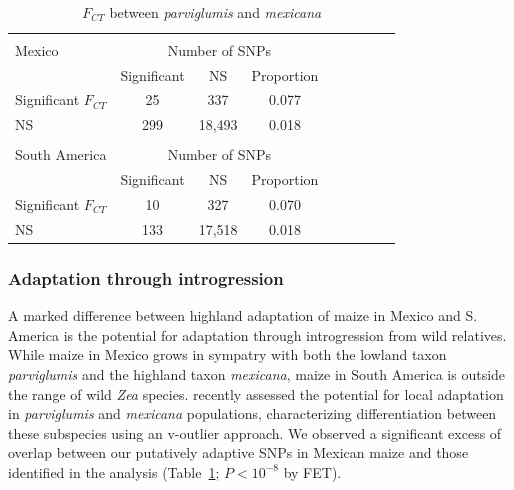 {{\begin{table}[tb]
\begin{center}
 \caption[]{$F_{CT}$ between \emph{parviglumis} and \emph{mexicana}\hspace*{0.3cm}}
  \textbf{}\\[-2mm]
{\fontsize{7}{11}\sf
    \begin{tabular}{lcccccccl} 
    \hline
       & & \\[-3mm]
Mexico     & \multicolumn{3}{c}{Number of SNPs}  \\
                                  & Significant & NS          & Proportion  \\
Significant $F_{CT}$ & 25              &   337       & 0.077\\ 
NS                             & 299            &  18,493   & 0.018\\
      \hline
    & & \\[-3mm]
South America     & \multicolumn{3}{c}{Number of SNPs} \\
                                     & Significant & NS           & Proportion  \\
Significant $F_{CT}$    & 10              &   327        & 0.070\\ 
NS                                & 133            &  17,518    & 0.018\\[1mm]
    \hline
    \end{tabular}
    \label{tanja}  %
}
\end{center}
\end{table}
\renewcommand{\arraystretch}{1}



\subsubsection{Adaptation through introgression}

A marked difference between highland adaptation of maize in Mexico and S. America is the potential for adaptation through introgression from wild relatives.  
While maize in Mexico grows in sympatry with both the lowland taxon \textit{parviglumis} and the highland taxon \textit{mexicana}, maize in South America is outside the range of wild \textit{Zea} species.
\citet{Pyhajarvi2013} recently assessed the potential for local adaptation in \textit{parviglumis} and \textit{mexicana} populations, characterizing differentiation between these subspecies using an v-outlier approach.
We observed a significant excess of overlap between our putatively adaptive SNPs in Mexican maize and those identified in the \citet{Pyhajarvi2013} analysis (Table~\ref{tanja}; $P<10^{-8}$ by FET). 

}}

